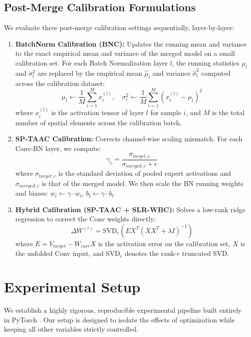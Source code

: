 \documentclass{article}
\theoremstyle{plain}
\theoremstyle{definition}
\theoremstyle{remark}
\begin{document}
\subsection{Post-Merge Calibration Formulations}
We evaluate three post-merge calibration settings sequentially, layer-by-layer:
\begin{enumerate}
    \item \textbf{BatchNorm Calibration (BNC):} Updates the running mean and variance to the exact empirical mean and variance of the merged model on a small calibration set. For each Batch Normalization layer $l$, the running statistics $\mu_l$ and $\sigma_l^2$ are replaced by the empirical mean $\hat{\mu}_l$ and variance $\hat{\sigma}_l^2$ computed across the calibration dataset:
    \begin{equation}
        \mu_l \leftarrow \frac{1}{M} \sum_{i=1}^M x_i^{(l)}, \quad \sigma_l^2 \leftarrow \frac{1}{M} \sum_{i=1}^M \left(x_i^{(l)} - \mu_l\right)^2
    \end{equation}
    where $x_i^{(l)}$ is the activation tensor of layer $l$ for sample $i$, and $M$ is the total number of spatial elements across the calibration batch.
    \item \textbf{SP-TAAC Calibration:} Corrects channel-wise scaling mismatch. For each Conv-BN layer, we compute:
    \begin{equation}
        \gamma_c = \frac{\sigma_{target, c}}{\sigma_{merged, c} + \epsilon}
    \end{equation}
    where $\sigma_{target, c}$ is the standard deviation of pooled expert activations and $\sigma_{merged, c}$ is that of the merged model. We then scale the BN running weights and biases: $w_l \leftarrow \gamma \cdot w_l$, $b_l \leftarrow \gamma \cdot b_l$.
    \item \textbf{Hybrid Calibration (SP-TAAC + SLR-WBC):} Solves a low-rank ridge regression to correct the Conv weights directly:
    \begin{equation}
        \Delta W^{(r)} = \text{SVD}_r \left( E X^T (X X^T + \lambda I)^{-1} \right)
    \end{equation}
    where $E = V_{target} - W_{curr} X$ is the activation error on the calibration set, $X$ is the unfolded Conv input, and SVD$_r$ denotes the rank-$r$ truncated SVD.
\end{enumerate}

\section{Experimental Setup}
\label{sec:setup}
We establish a highly rigorous, reproducible experimental pipeline built entirely in PyTorch \cite{paszke2019pytorch}. Our setup is designed to isolate the effects of optimization while keeping all other variables strictly controlled.
\end{document}

